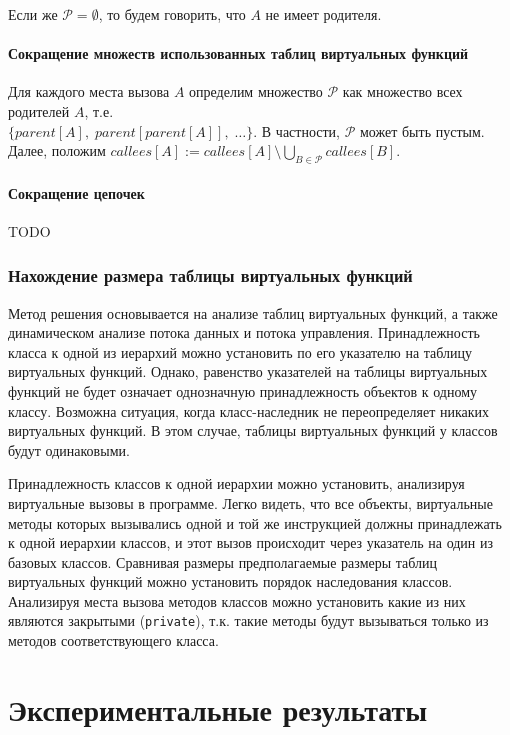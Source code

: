 \documentclass[a4paper,12pt,russian]{article}
\begin{document}
Если же $\mathcal{P} = \emptyset$, то будем говорить, что $A$ не имеет родителя.
\paragraph{Сокращение множеств использованных таблиц виртуальных функций}
Для каждого места вызова $A$ определим множество $\mathcal{P}$ как множество всех родителей $A$, т.е.\\$\{parent[A],\;parent[parent[A]],\;\dots\}$.
В частности, $\mathcal{P}$ может быть пустым.
Далее, положим $callees[A] := callees[A] \setminus \bigcup\limits_{B \in \mathcal{P}}callees[B]$.

\paragraph{Сокращение цепочек}
TODO

\subsubsection{Нахождение размера таблицы виртуальных функций}
Метод решения основывается на анализе таблиц виртуальных функций, а также динамическом анализе потока данных и потока управления.
Принадлежность класса к одной из иерархий можно установить по его указателю на таблицу виртуальных функций.
Однако, равенство указателей на таблицы виртуальных функций не будет означает однозначную принадлежность объектов к одному классу.
Возможна ситуация, когда класс-наследник не переопределяет никаких виртуальных функций.
В этом случае, таблицы виртуальных функций у классов будут одинаковыми.

Принадлежность классов к одной иерархии можно установить, анализируя виртуальные вызовы в программе.
Легко видеть, что все объекты, виртуальные методы которых вызывались одной и той же инструкцией должны принадлежать к одной иерархии классов, и этот вызов происходит через указатель на один из базовых классов. Сравнивая размеры предполагаемые размеры таблиц виртуальных функций можно установить порядок наследования классов.
Анализируя места вызова методов классов можно установить какие из них являются закрытыми (\texttt{private}), т.к. такие методы будут вызываться только из методов соответствующего класса.

\newpage
\section{Экспериментальные результаты}
\end{document}
